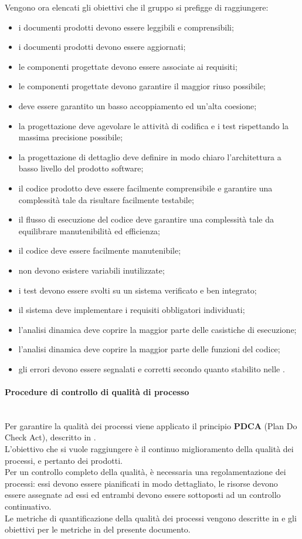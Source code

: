 Vengono ora elencati gli obiettivi che il gruppo si prefigge di raggiungere:
\begin{itemize}
	\item i documenti prodotti devono essere leggibili e comprensibili;
	\item i documenti prodotti devono essere aggiornati;
	\item le componenti progettate devono essere associate ai requisiti;
	\item le componenti progettate devono garantire il maggior riuso possibile;
	\item deve essere garantito un basso accoppiamento ed un'alta coesione;
	\item la progettazione deve agevolare le attività di codifica e i test rispettando la massima precisione possibile;
	\item la progettazione di dettaglio deve definire in modo chiaro l'architettura a basso livello del prodotto software;
	\item il codice prodotto deve essere facilmente comprensibile e garantire una complessità tale da risultare facilmente testabile;
	\item il flusso di esecuzione del codice deve garantire una complessità tale da equilibrare manutenibilità ed efficienza;
	\item il codice deve essere facilmente manutenibile;
	\item non devono esistere variabili inutilizzate;
	\item i test devono essere svolti su un sistema verificato e ben integrato;
	\item il sistema deve implementare i requisiti obbligatori individuati;
	\item l'analisi dinamica deve coprire la maggior parte delle casistiche di esecuzione;
	\item l'analisi dinamica deve coprire la maggior parte delle funzioni del codice;
	\item gli errori devono essere segnalati e corretti secondo quanto stabilito nelle \NormeDiProgetto{}.
\end{itemize}

\paragraph{Procedure di controllo di qualità di processo}\mbox{}\\
Per garantire la qualità dei processi viene applicato il principio \textbf{PDCA} (Plan Do Check Act), descritto in .\\ 
L'obiettivo che si vuole raggiungere è il continuo miglioramento della qualità dei processi, e pertanto dei prodotti.\\
Per un controllo completo della qualità, è necessaria una regolamentazione dei processi: essi devono essere pianificati in modo dettagliato, le risorse devono essere assegnate ad essi ed entrambi devono essere sottoposti ad un controllo continuativo.\\
Le metriche di quantificazione della qualità dei processi vengono descritte in \NormeDiProgetto{} e gli obiettivi per le metriche in  del presente documento.

